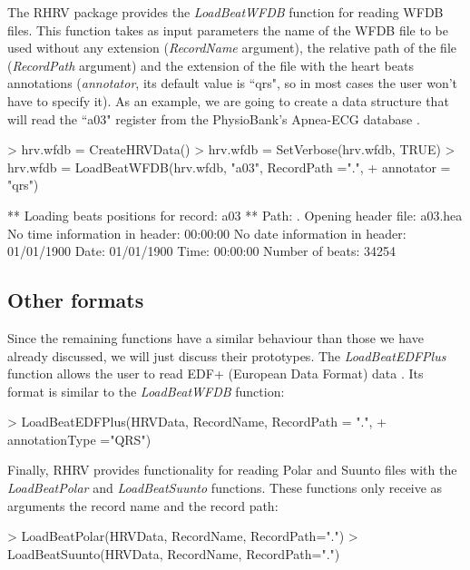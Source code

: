 \documentclass[12pt,lot, lof]{puthesis}
\begin{document}
The RHRV package provides the \textit{LoadBeatWFDB} function for reading WFDB 
files. This function takes as input parameters the name of the WFDB file to be 
used without any extension (\textit{RecordName} argument), the  relative path 
of the file (\textit{RecordPath} argument) and the extension of the file with 
the heart beats annotations (\textit{annotator}, its default value is ``qrs", 
so in most cases the user won't have to specify it). As an example, we are 
going to
 create a data structure that will read the ``a03" register from the 
PhysioBank's Apnea-ECG database \cite{penzel2000apnea}.
\begin{Schunk}
\begin{Sinput}
> hrv.wfdb = CreateHRVData()
> hrv.wfdb = SetVerbose(hrv.wfdb, TRUE)
> hrv.wfdb = LoadBeatWFDB(hrv.wfdb, "a03", RecordPath =".",
+  annotator = "qrs")
\end{Sinput}
\begin{Soutput}
** Loading beats positions for record: a03 **
   Path: . 
   Opening header file: a03.hea 
      No time information in header: 00:00:00 
      No date information in header: 01/01/1900 
   Date: 01/01/1900
   Time: 00:00:00
   Number of beats: 34254 
\end{Soutput}
\end{Schunk}

\subsection{Other formats} Since the remaining functions have a similar 
behaviour than those we have already discussed, we will just discuss their 
prototypes. The \textit{LoadBeatEDFPlus} function allows the user to read EDF+ 
(European Data Format) data \cite{kemp2003european}. Its format is similar to 
the \textit{LoadBeatWFDB} function:
\begin{Schunk}
\begin{Sinput}
> LoadBeatEDFPlus(HRVData, RecordName, RecordPath = ".", 
+ 	annotationType ="QRS")
\end{Sinput}
\end{Schunk}
Finally, RHRV provides functionality for reading Polar and Suunto files with 
the \textit{LoadBeatPolar} and \textit{LoadBeatSuunto} functions. These 
functions only receive as arguments the record name and the record path:
\begin{Schunk}
\begin{Sinput}
> LoadBeatPolar(HRVData, RecordName, RecordPath=".")
> LoadBeatSuunto(HRVData, RecordName, RecordPath=".")
\end{Sinput}
\end{Schunk}
\end{document}
